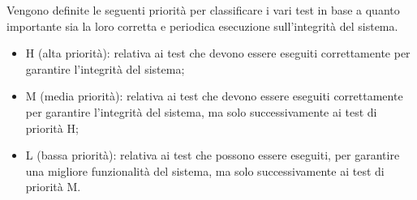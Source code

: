 Vengono definite le seguenti priorità per classificare i vari test in base a quanto importante sia la
loro corretta e periodica esecuzione sull'integrità del sistema.
\begin{itemize}
    \item H (alta priorità): relativa ai test che devono essere eseguiti correttamente per garantire l'integrità
          del sistema;
    \item M (media priorità): relativa ai test che devono essere eseguiti correttamente per garantire l'integrità
          del sistema, ma solo successivamente ai test di priorità H;
    \item L (bassa priorità): relativa ai test che possono essere eseguiti, per garantire una migliore funzionalità
          del sistema, ma solo successivamente ai test di priorità M.
\end{itemize}


